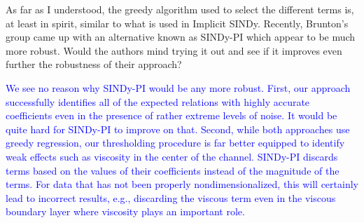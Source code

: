\documentclass{article}
\newcommand{\response}{\textcolor{blue}}
\begin{document}
\medskip
As far as I understood, the greedy algorithm used to select the different  terms  is,  at  least  in  spirit,  similar  to  what  is  used  in  Implicit SINDy.  Recently, Brunton’s group came up with an alternative known as SINDy-PI which appear to be much more robust.  Would the authors mind trying it out and see if it improves even further the robustness of their approach?
    
\medskip
\response{
We see no reason why SINDy-PI would be any more robust. First, our approach successfully identifies all of the expected relations with highly accurate coefficients even in the presence of rather extreme levels of noise. It would be quite hard for SINDy-PI to improve on that. Second, while both approaches use greedy regression, our thresholding procedure is far better equipped to identify weak effects such as viscosity in the center of the channel. SINDy-PI discards terms based on the values of their coefficients instead of the magnitude of the terms. For data that has not been properly nondimensionalized, this will certainly lead to incorrect results, e.g., discarding the viscous term even in the viscous boundary layer where viscosity plays an important role.
}
\end{document}

